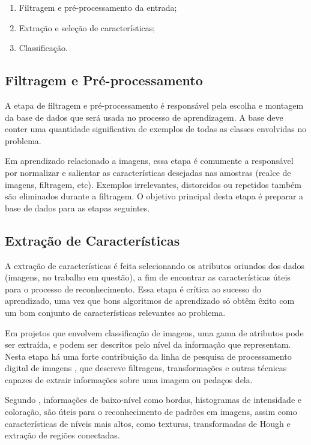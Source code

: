 \begin{enumerate}
    \item Filtragem e pré-processamento da entrada;
    \item Extração e seleção de características;
    \item Classificação.
\end{enumerate}


\subsection{Filtragem e Pré-processamento}

A etapa de filtragem e pré-processamento é responsável pela escolha e montagem da base de dados que será usada no processo de aprendizagem. A base deve conter uma quantidade significativa de exemplos de todas as classes envolvidas no problema.

Em aprendizado relacionado a imagens, essa etapa é comumente a responsável por normalizar e salientar as características desejadas nas amostras (realce de imagens, filtragem, etc). Exemplos irrelevantes, distorcidos ou repetidos também são eliminados durante a filtragem. O objetivo principal desta etapa é preparar a base de dados para as etapas seguintes.


\subsection{Extração de Características}

A extração de características é feita selecionando os atributos oriundos dos dados (imagens, no trabalho em questão), a fim de encontrar as características úteis para o processo de reconhecimento. Essa etapa é crítica ao sucesso do aprendizado, uma vez que bons algoritmos de aprendizado só obtêm êxito com um bom conjunto de características relevantes ao problema.

Em projetos que envolvem classificação de imagens, uma gama de atributos pode ser extraída, e podem ser descritos pelo nível da informação que representam. Nesta etapa há uma forte contribuição da linha de pesquisa de processamento digital de imagens \cite{gonzalez:2002}, que descreve filtragens, transformações e outras técnicas capazes de extrair informações sobre uma imagem ou pedaços dela.

Segundo , informações de baixo-nível como bordas, histogramas de intensidade e coloração, são úteis para o reconhecimento de padrões em imagens, assim como características de níveis mais altos, como texturas, transformadas de Hough e extração de regiões conectadas.


